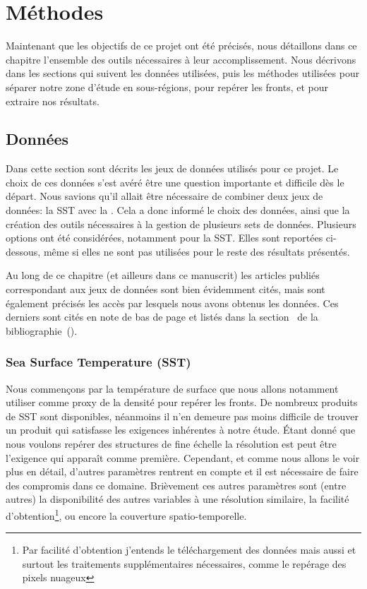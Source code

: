 
\chapter{Méthodes}
\addChpLof
\label{chp:methodes}
\graphicspath{{resources/méthodes}}

{
  \hypersetup{hidelinks}
  \minitoc%
  \clearpage
}

Maintenant que les objectifs de ce projet ont été précisés, nous détaillons dans ce chapitre l'ensemble des outils nécessaires à leur accomplissement.
Nous décrivons dans les sections qui suivent les données utilisées, puis les méthodes utilisées pour séparer notre zone d'étude en sous-régions, pour repérer les fronts, et pour extraire nos résultats.

\section{Données}
\label{sec:donnees}

Dans cette section sont décrits les jeux de données utilisés pour ce projet.
Le choix de ces données s'est avéré être une question importante et difficile dès le départ.
Nous savions qu'il allait être nécessaire de combiner deux jeux de données: la SST avec la .
Cela a donc informé le choix des données, ainsi que la création des outils nécessaires à la gestion de plusieurs sets de données.
Plusieurs options ont été considérées, notamment pour la SST.
Elles sont reportées ci-dessous, même si elles ne sont pas utilisées pour le reste des résultats présentés.

Au long de ce chapitre (et ailleurs dans ce manuscrit) les articles publiés correspondant aux jeux de données sont bien évidemment cités, mais sont également précisés les accès par lesquels nous avons obtenus les données.
Ces derniers sont cités en note de bas de page et listés dans la section~ de la bibliographie~().

\subsection{Sea Surface Temperature (SST)}
\label{sec:donnees-sst}

Nous commençons par la température de surface que nous allons notamment utiliser comme proxy de la densité pour repérer les fronts.
De nombreux produits de SST sont disponibles, néanmoins il n'en demeure pas moins difficile de trouver un produit qui satisfasse les exigences inhérentes à notre étude.
Étant donné que nous voulons repérer des structures de fine échelle la résolution est peut être l’exigence qui apparaît comme première.
Cependant, et comme nous allons le voir plus en détail, d'autres paramètres rentrent en compte et il est nécessaire de faire des compromis dans ce domaine.
Brièvement ces autres paramètres sont (entre autres) la disponibilité des autres variables à une résolution similaire, la facilité d'obtention\footnote{%
  Par facilité d'obtention j'entends le téléchargement des données mais aussi et surtout les traitements supplémentaires nécessaires, comme le repérage des pixels nuageux },
ou encore la couverture spatio-temporelle.

